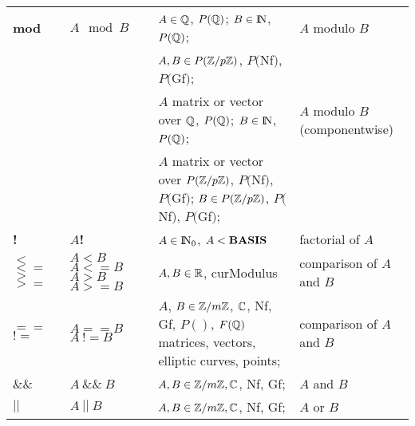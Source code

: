 \begin{tabular}{|p{0.3in}|p{0.7in}|p{2.5in}|p{1.88in}|}
{\bf \rm mod} &
{\bf $A\mod B$} &
$A\in \mbox{$\mathbb Q$}$, $P(\mbox{$\mathbb Q$} )$; $B\in {\rm{I\!N}}$, $P(\mbox{$\mathbb Q$})$;&
$A$ modulo $B$ \\
\cline{3-3} & &
$A, B\in P(\mbox{$\mathbb Z$} /p\mbox{$\mathbb Z$} )$, $P($Nf$)$, $P($Gf$)$; & \\
\cline{3-4} & &
$A$ matrix or vector over $\mbox{$\mathbb Q$}$, $P(\mbox{$\mathbb Q$} )$; \newline
$B\in {\rm{I\!N}}$, $P(\mbox{$\mathbb Q$} )$; &
$A$  modulo $B$\newline (componentwise) \\
\cline{3-3} & &
$A$ matrix or vector over $P(\mbox{$\mathbb Z$} /p\mbox{$\mathbb Z$} )$, \newline
\hspace*{0.3cm} $P($Nf$)$, $P($Gf$)$;\newline
$B\in P(\mbox{$\mathbb Z$} /p\mbox{$\mathbb Z$} )$, $P($Nf$)$, $P($Gf$)$; & \\ \hline

{\bf !} &
{\bf $A$!} &
$A\in {\rm{I\!N}}_0$, $A < {\rm {\bf BASIS}}$ &
factorial of $A$ \\ \hline

{\bf $<$}\newline
{\bf $<=$}\newline
{\bf $>$}\newline
{\bf $>=$} &
{\bf $A < B$}\newline
{\bf $A <= B$}\newline
{\bf $A > B$}\newline
{\bf $A >= B$} &
$A, B \in \mbox{$\mathbb R$}$, curModulus &
comparison of $A$ and $B$ \\ \hline

{\bf $==$}\newline
{\bf $!=$}\newline &
{\bf $A==B$}\newline
{\bf $A\ !=B$}\newline &
$A$, $B\in \mbox{$\mathbb Z$}/m\mbox{$\mathbb Z$}$, $\mbox{$\mathbb C$}$, Nf, Gf, $P()$, $F(\mbox{$\mathbb Q$})$\newline
\hspace*{1.2cm} matrices, vectors,\newline
\hspace*{1.2cm} elliptic curves, points; &
comparison of $A$ and $B$ \\ \hline

{\bf $\&\&$} &
{\bf $A\ \&\&\ B$} &
$A, B \in \mbox{$\mathbb Z$}/m\mbox{$\mathbb Z$}, \mbox{$\mathbb C$}$, Nf, Gf; &
$A$ and $B$ \\ \hline

{\bf $||$} &
{\bf $A\ ||\ B$} &
$A, B \in \mbox{$\mathbb Z$}/m\mbox{$\mathbb Z$}, \mbox{$\mathbb C$}$, Nf, Gf; &
$A$ or $B$ \\ \hline
\end{tabular}

